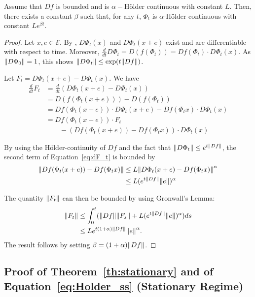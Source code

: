 \documentclass[acmlarge]{acmart}
\newcommand\E{\mathcal{E}}
\newcommand\norm[1]{{\mathchoice{\bnorm{#1}}{\snorm{#1}}{\snorm{#1}}{\snorm{#1}}}}
\newcommand\bnorm[1]{\left\|#1\right\|}
\newcommand\snorm[1]{\|#1\|}
\newcommand\dt{\frac{d}{dt}}
\newcommand\p[1]{\left(#1\right)}
\begin{document}
\begin{lemma}
  \label{lem:Holder}
  Assume that $Df$ is bounded and is $\alpha-$Hölder continuous with
  constant $L$. Then, there exists a constant $\beta$ such that, for
  any $t$, $\Phi_t$ is $\alpha$-Hölder continuous with constant
  $Le^{\beta t}$.
\end{lemma}
\begin{proof}
  Let $x,e\in\E$. By \cite[Theorem~3.7.1 of Part~II]{cartan1977cours},
  $D\Phi_t(x)$ and $D\Phi_t(x+e)$ exist and are differentiable with
  respect to time. Moreover,
  $\dt D\Phi_t=D(f(\Phi_t))=Df(\Phi_t)\cdot D\Phi_t(x)$. As
  $\norm{D\Phi_0}=1$, this shows $\norm{D\Phi_t}\le\exp(t\norm{Df})$.

  Let $F_t=D\Phi_t(x+e)-D\Phi_t(x)$. We have
  \begin{align}
    \dt F_t &= \dt \p{D\Phi_t(x+e)-D\Phi_t(x)}\nonumber\\
            &= D(f(\Phi_t(x+e))) - D(f(\Phi_t))\nonumber\\
            &= Df (\Phi_t(x+e))\cdot D\Phi_t(x+e) - Df(\Phi_tx)\cdot
              D\Phi_t(x)\nonumber\\
            &= Df (\Phi_t(x+e))\cdot F_t \nonumber\\
            &\qquad -\p{Df(\Phi_t(x+e))-Df(\Phi_tx)}\cdot D\Phi_t(x)
              \label{eq:dF_t}
  \end{align}
  
  By using the Hölder-continuity of $Df$ and the fact that
  $\norm{D\Phi_t}\le e^{t\norm{Df}}$, the second term of
  Equation~\eqref{eq:dF_t} is bounded by
  \begin{align*}
    \norm{Df(\Phi_t(x+e))-Df(\Phi_tx)}
    &\le L\norm{D\Phi_t(x+e)-Df(\Phi_tx)}^\alpha\\
    &\le L(e^{t\norm{Df}}\norm{e})^\alpha 
  \end{align*}

  The quantity $\norm{F_t}$ can then be bounded by using Gronwall's
  Lemma:
  \begin{align*}
    \norm{F_t}&\le \int_0^t(\norm{Df} \norm{F_s} +
    L(e^{t\norm{Df}}\norm{e})^\alpha)ds \\
              &\le L e^{t(1+\alpha)\norm{Df}}\norm{e}^\alpha.
  \end{align*}
  The result follows by setting $\beta=(1+\alpha)\norm{Df}$.
\end{proof}



\subsection{Proof of Theorem~\ref{th:stationary} and of
  Equation~\eqref{eq:Holder_ss} (Stationary Regime)}
\label{sec:proof_ss}
\end{document}
